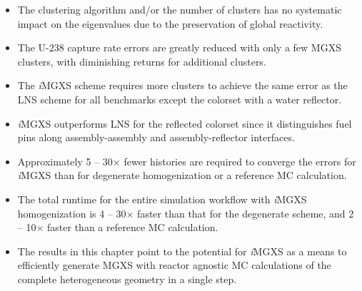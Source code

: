 \vfill
\begin{highlightsbox}[frametitle=Highlights]
\begin{itemize}
  \item The clustering algorithm and/or the number of clusters has no systematic impact on the eigenvalues due to the preservation of global reactivity.
  \item The U-238 capture rate errors are greatly reduced with only a few \ac{MGXS} clusters, with diminishing returns for additional clusters.
  \item The \textit{i}\ac{MGXS} scheme requires more clusters to achieve the same error as the \ac{LNS} scheme for all benchmarks except the colorset with a water reflector.
  \item \textit{i}\ac{MGXS} outperforms \ac{LNS} for the reflected colorset since it distinguishes fuel pins along assembly-assembly and assembly-reflector interfaces.
  \item Approximately 5 -- 30$\times$ fewer histories are required to converge the errors for \textit{i}\ac{MGXS} than for degenerate homogenization or a reference \ac{MC} calculation.
  \item The total runtime for the entire simulation workflow with \textit{i}\ac{MGXS} homogenization is 4 -- 30$\times$ faster than that for the degenerate scheme, and 2 -- 10$\times$ faster than a reference \ac{MC} calculation.
  \item The results in this chapter point to the potential for \textit{i}\ac{MGXS} as a means to efficiently generate \ac{MGXS} with reactor agnostic \ac{MC} calculations of the complete heterogeneous geometry in a single step.
\end{itemize}
\end{highlightsbox}
\vfill
